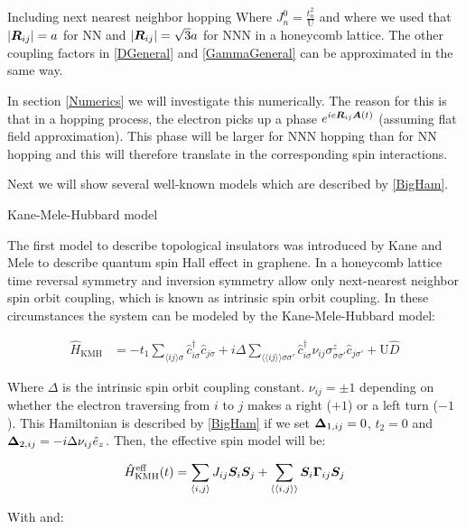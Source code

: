 \begin{section}{Including next nearest neighbor hopping}
Where $J_n^0 = \frac{t_n^2}{\text{U}}$ and where we used that $|\boldsymbol{R}_{ij}| = a$ for NN and $|\boldsymbol{R}_{ij}| = \sqrt{3}a$ for NNN in a honeycomb lattice. The other coupling factors in \ref{DGeneral} and \ref{GammaGeneral} can be approximated in the same way.

In section \ref{Numerics} we will investigate this numerically. The reason for this is that in a hopping process, the electron picks up a phase $e^{ie\boldsymbol{R}_{ij}\boldsymbol{A}(t)}$ (assuming flat field approximation). This phase will be larger for NNN hopping than for NN hopping and this will therefore translate in the corresponding spin interactions.

Next we will show several well-known models which are described by \ref{BigHam}.

\begin{subsection}{Kane-Mele-Hubbard model}

The first model to describe topological insulators was introduced by Kane and Mele \cite{Kane2005} to describe quantum spin Hall effect in graphene. In a honeycomb lattice time reversal symmetry and inversion symmetry allow only next-nearest neighbor spin orbit coupling, which is known as intrinsic spin orbit coupling. In these circumstances the system can be modeled by the Kane-Mele-Hubbard model:

\begin{align}
\label{KMH}
\hat{H}_{\text{KMH}} &= -t_1\sum_{\langle i j \rangle \sigma} \hat{c}^{\dagger}_{i\sigma}\hat{c}_{j\sigma} + i\Delta \sum_{\langle \langle i j \rangle \rangle \sigma \sigma'} \hat{c}^{\dagger}_{i\sigma} \nu_{ij} \sigma^z_{\sigma \sigma'} \hat{c}_{j\sigma'} + \text{U}\hat{D}
\end{align}

Where $\Delta$ is the intrinsic spin orbit coupling constant. $\nu_{ij}=\pm 1$ depending on whether the electron traversing from $i$ to $j$ makes a right ($+1$) or a left turn ($-1$). This Hamiltonian is described by \ref{BigHam} if we set $\boldsymbol{\Delta}_{1,ij} = 0$, $t_2 = 0$ and $\boldsymbol{\Delta}_{2,ij} = -i\Delta \nu_{ij} \hat{e}_z$. Then, the effective spin model will be:

\begin{equation}
\label{KMHeff}
\hat{H}_{\text{KMH}}^{\text{eff}}(t) = \sum_{\langle i,j \rangle} J_{ij} \boldsymbol{S}_i \boldsymbol{S}_j + \sum_{\langle \langle i,j \rangle \rangle} \boldsymbol{S}_i \boldsymbol{\Gamma}_{ij} \boldsymbol{S}_j 
\end{equation}

With and:


\end{subsection}
\end{section}
